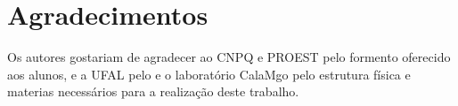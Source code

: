 \documentclass[10pt, conference]{IEEEtran}
\begin{document}
\maketitle









\iffinal
\section*{Agradecimentos}
%
Os autores gostariam de agradecer ao CNPQ e PROEST pelo formento oferecido aos alunos, e a UFAL
pelo e o laboratório CalaMgo pelo estrutura física e materias necessários para a realização deste
trabalho.
\fi








\end{document}
